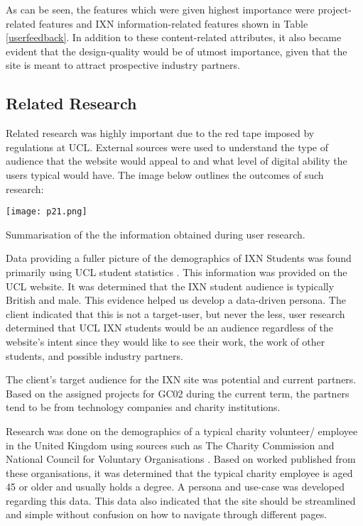 \documentclass[fontsize=11pt]{extarticle}
\numberwithin{figure}{section} %
\numberwithin{table}{section}%
\begin{document}
As can be seen, the features which were given highest importance were
project-related features and IXN information-related features shown in
Table \ref{userfeedback}. In addition to these content-related
attributes, it also became evident that the design-quality would be of
utmost importance, given that the site is meant to attract prospective
industry partners.

\hypertarget{related-research}{%
\subsection{Related Research}\label{related-research}}

Related research was highly important due to the red tape imposed by
regulations at UCL. External sources were used to understand the type of
audience that the website would appeal to and what level of digital
ability the users typical would have. The image below outlines the
outcomes of such research:

\begin{table}[H]
      \centering
      \texttt{[image: p21.png]}
      \caption{Summarisation of the the information obtained during user research.}
 \end{table}

Data providing a fuller picture of the demographics of IXN Students was
found primarily using UCL student statistics \cite{ps1}. This
information was provided on the UCL website. It was determined that the
IXN student audience is typically British and male. This evidence helped
us develop a data-driven persona. The client indicated that this is not
a target-user, but never the less, user research determined that UCL IXN
students would be an audience regardless of the website's intent since
they would like to see their work, the work of other students, and
possible industry partners.

The client's target audience for the IXN site was potential and current
partners. Based on the assigned projects for GC02 during the current
term, the partners tend to be from technology companies and charity
institutions.

Research was done on the demographics of a typical charity volunteer/
employee in the United Kingdom using sources such as The Charity
Commission \cite{ps2} and National Council for Voluntary Organisations
\cite{ps3}. Based on worked published from these organisations, it was
determined that the typical charity employee is aged 45 or older and
usually holds a degree. A persona and use-case was developed regarding
this data. This data also indicated that the site should be streamlined
and simple without confusion on how to navigate through different pages.
\end{document}
